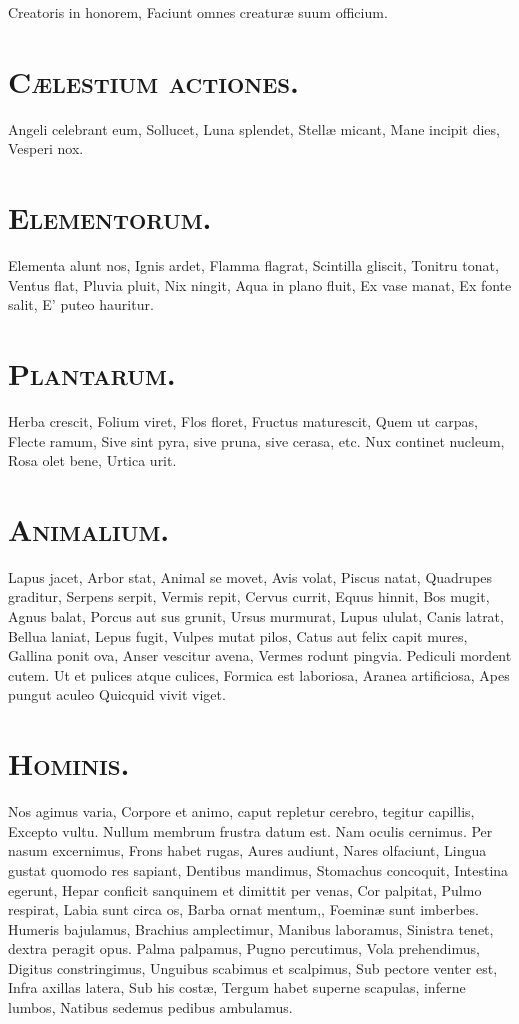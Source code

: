 \documentclass[12pt, twocolumn]{memoir}
\begin{document}
Creatoris in honorem,
Faciunt omnes creaturæ suum officium.

\section*{\textsc{Cælestium actiones.}}

Angeli celebrant eum,
Sollucet,
Luna splendet,
Stellæ micant,
Mane incipit dies,
Vesperi nox.

\section*{\textsc{Elementorum.}}

Elementa alunt nos,
Ignis ardet,
Flamma flagrat,
Scintilla gliscit,
Tonitru tonat,
Ventus flat,
Pluvia pluit,
Nix ningit,
Aqua in plano fluit,
Ex vase manat,
Ex fonte salit,
E' puteo hauritur.

\section*{\textsc{Plantarum.}}

Herba crescit,
Folium viret,
Flos floret,
Fructus maturescit,
Quem ut carpas,
Flecte ramum,
Sive sint pyra, sive pruna, sive cerasa, etc.
Nux continet nucleum,
Rosa olet bene,
Urtica urit.

\section*{\textsc{Animalium.}}

Lapus jacet,
Arbor stat,
Animal se movet,
Avis volat,
Piscus natat,
Quadrupes graditur,
Serpens serpit,
Vermis repit,
Cervus currit,
Equus hinnit,
Bos mugit,
Agnus balat,
Porcus aut sus grunit,
Ursus murmurat,
Lupus ululat,
Canis latrat,
Bellua laniat,
Lepus fugit,
Vulpes mutat pilos,
Catus aut felix capit mures,
Gallina ponit ova,
Anser vescitur avena,
Vermes rodunt pingvia.
Pediculi mordent cutem.
Ut et pulices atque culices,
Formica est laboriosa,
Aranea artificiosa,
Apes pungut aculeo 
Quicquid vivit viget.

\section*{\textsc{Hominis.}}

Nos agimus varia,
Corpore et animo,
caput repletur cerebro,
tegitur capillis,
Excepto vultu.
Nullum membrum frustra datum est.
Nam oculis cernimus.
Per nasum excernimus,
Frons habet rugas,
Aures audiunt,
Nares olfaciunt,
Lingua gustat quomodo res sapiant,
Dentibus mandimus,
Stomachus concoquit,
Intestina egerunt,
Hepar conficit sanquinem et dimittit per venas,
Cor palpitat,
Pulmo respirat,
Labia sunt circa os,
Barba ornat mentum,,
Foeminæ sunt imberbes.
Humeris bajulamus,
Brachius amplectimur,
Manibus laboramus,
Sinistra tenet, dextra peragit opus.
Palma palpamus,
Pugno percutimus,
Vola prehendimus,
Digitus constringimus,
Unguibus scabimus et scalpimus,
Sub pectore venter est,
Infra axillas latera,
Sub his costæ,
Tergum habet superne scapulas, inferne lumbos,
Natibus sedemus pedibus ambulamus.
\end{document}
